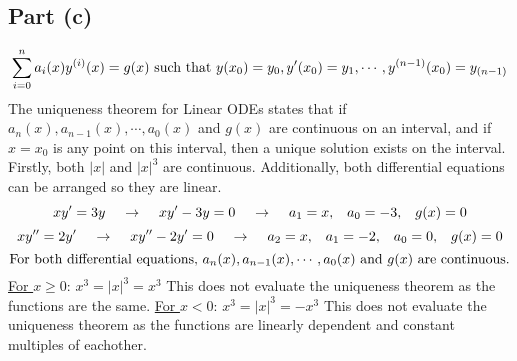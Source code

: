 \documentclass{article}
\begin{document}
\subsection*{Part (c)}
\begin{center}
\[\sum_{i=0}^na_i(x)y^{(i)}(x)=g(x)\textnormal{ such that }y(x_0)=y_0, y'(x_0)=y_1,\cdots,y^{(n-1)}(x_0)=y_{(n-1)}\]
The uniqueness theorem for Linear ODEs states that if \(a_n(x),a_{n-1}(x),\cdots,a_0(x)\) and \(g(x)\) are continuous on an interval, and if \(x=x_0\) is any point on this interval, then a unique solution exists on the interval. Firstly, both \(|x|\) and \(|x|^3\) are continuous. Additionally, both differential equations can be arranged so they are linear.
\[xy'=3y\hspace{4 mm}\rightarrow\hspace{4 mm}xy'-3y=0\hspace{4 mm}\rightarrow\hspace{4 mm}a_1=x,\,\,\,\,\,a_0=-3,\,\,\,\,\,g(x)=0\]
\[xy''=2y'\hspace{4 mm}\rightarrow\hspace{4 mm}xy''-2y'=0\hspace{4 mm}\rightarrow\hspace{4 mm}a_2=x,\,\,\,\,\,a_1=-2,\,\,\,\,\,a_0=0,\,\,\,\,\,g(x)=0\]
\[\textnormal{For both differential equations, } a_n(x),a_{n-1}(x),\cdots,a_0(x) \textnormal{ and } g(x) \textnormal{ are continuous.}\]
\newline
\underline{For \(x\geq0\)}: \(x^3=|x|^3=x^3\) This does not evaluate the uniqueness theorem as the functions are the same.
\newline
\newline
\underline{For \(x<0\)}: \(x^3=|x|^3=-x^3\) This does not evaluate the uniqueness theorem as the functions are linearly dependent and constant multiples of eachother.

\end{center}
\end{document}
